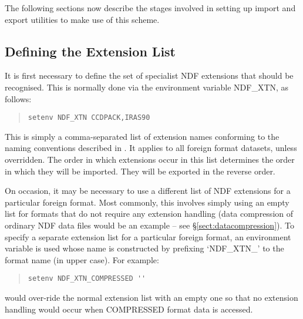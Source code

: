 The following sections now describe the stages involved in setting up
import and export utilities to make use of this scheme.

\subsection{\label{sect:extensionlist}Defining the Extension List}

It is first necessary to define the set of specialist NDF extensions
that should be recognised. This is normally done via the environment
variable NDF\_XTN, as follows:

\begin{quote}
\begin{small}
\begin{verbatim}
setenv NDF_XTN CCDPACK,IRAS90
\end{verbatim}
\end{small}
\end{quote}

This is simply a comma-separated list of extension names conforming to
the naming conventions described in
. It
applies to all foreign format datasets, unless overridden. The order
in which extensions occur in this list determines the order in which
they will be imported. They will be exported in the reverse order.

On occasion, it may be necessary to use a different list of NDF
extensions for a particular foreign format. Most commonly, this
involves simply using an empty list for formats that do not require
any extension handling (data compression of ordinary NDF data files
would be an example -- see \S\ref{sect:datacompression}). To specify a
separate extension list for a particular foreign format, an
environment variable is used whose name is constructed by prefixing
`NDF\_XTN\_' to the format name (in upper case). For example:

\begin{quote}
\begin{small}
\begin{verbatim}
setenv NDF_XTN_COMPRESSED ''
\end{verbatim}
\end{small}
\end{quote}

would over-ride the normal extension list with an empty one so that no
extension handling would occur when COMPRESSED format data is
accessed.

